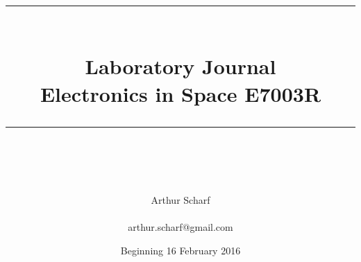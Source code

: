 \documentclass[idxtotoc,hyperref,openany]{labbook} %
\newcommand{\HRule}{\rule{\linewidth}{0.5mm}} %
\begin{document}

\frontmatter %
\title{
\begin{center}
\HRule \\[0.4cm]
{\Huge \bfseries Laboratory Journal \\[0.5cm] \Large Electronics in Space E7003R}\\[0.4cm] %
\HRule \\[1.5cm]
\end{center}
}
\author{\Huge Arthur Scharf \\ \\ \LARGE arthur.scharf@gmail.com \\[2cm]} %
\date{Beginning 16 February 2016} %
\maketitle

\tableofcontents

\mainmatter %













\end{document}
